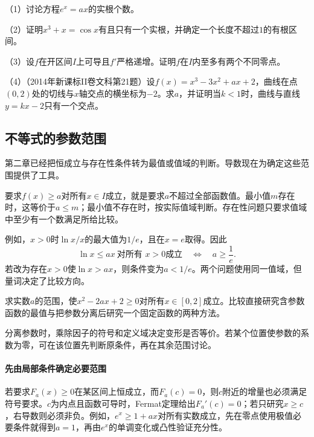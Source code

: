 \begin{exercise}
\mbox{}\par\nobreak

（1）讨论方程\(e^x=ax\)的实根个数。

（2）证明\(x^3+x=\cos x\)有且只有一个实根，并确定一个长度不超过\(1\)的有根区间。

（3）设\(f\)在开区间\(I\)上可导且\(f'\)严格递增。证明\(f\)在\(I\)内至多有两个不同零点。

（4）（2014年新课标II卷文科第21题）设\(f(x)=x^3-3x^2+ax+2\)，曲线在点\((0,2)\)处的切线与\(x\)轴交点的横坐标为\(-2\)。求\(a\)，并证明当\(k<1\)时，曲线与直线\(y=kx-2\)只有一个交点。
\end{exercise}

\subsection{不等式的参数范围}

第二章已经把恒成立与存在性条件转为最值或值域的判断。导数现在为确定这些范围提供了工具。

要求\(f(x)\ge a\)对所有\(x\in I\)成立，就是要求\(a\)不超过全部函数值。最小值\(m\)存在时，这等价于\(a\le m\)；最小值不存在时，按实际值域判断。存在性问题只要求值域中至少有一个数满足所给比较。

例如，\(x>0\)时\(\ln x/x\)的最大值为\(1/e\)，且在\(x=e\)取得。因此
\begin{equation*}
 \ln x\le ax\ \text{对所有 }x>0\text{成立}
 \quad\Longleftrightarrow\quad a\ge\frac1e.
\end{equation*}
若改为存在\(x>0\)使\(\ln x>ax\)，则条件变为\(a<1/e\)。两个问题使用同一值域，但量词决定了比较方向。

\begin{example}
求实数\(a\)的范围，使\(x^2-2ax+2\ge0\)对所有\(x\in[0,2]\)成立。比较直接研究含参数函数的最值与把参数分离后研究一个固定函数的两种方法。
\end{example}

分离参数时，乘除因子的符号和定义域决定变形是否等价。若某个位置使参数的系数为零，可在该位置先判断原条件，再在其余范围讨论。

\paragraph{先由局部条件确定必要范围} \mbox{}

若要求\(F_a(x)\ge0\)在某区间上恒成立，而\(F_a(c)=0\)，则\(c\)附近的增量也必须满足符号要求。\(c\)为内点且函数可导时，Fermat定理给出\(F_a'(c)=0\)；若只研究\(x\ge c\)，右导数则必须非负。例如，\(e^x\ge1+ax\)对所有实数成立，先在零点使用极值必要条件就得到\(a=1\)，再由\(e^x\)的单调变化或凸性验证充分性。

